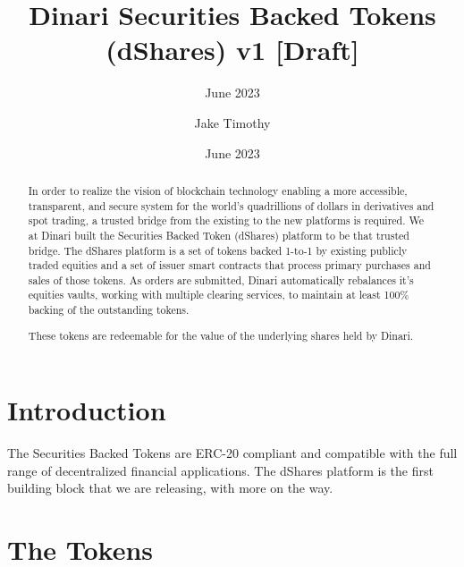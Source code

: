 \documentclass[sigconf,nonacm,prologue,table]{acmart}
\begin{document}
\title{Dinari Securities Backed Tokens (dShares) v1 [Draft]}
\subtitle{June 2023}
\date{June 2023}

\author{Jake Timothy}
\affiliation{}

\begin{teaserfigure}
\caption*{
    \hspace{\textwidth}
    }
\end{teaserfigure}

\renewcommand{\shortauthors}{Timothy}

\begin{abstract}

In order to realize the vision of blockchain technology enabling a more accessible, transparent, and secure system for the world’s quadrillions of dollars in derivatives and spot trading, a trusted bridge from the existing to the new platforms is required. We at Dinari built the Securities Backed Token (dShares) platform to be that trusted bridge. The dShares platform is a set of tokens backed 1-to-1 by existing publicly traded equities and a set of issuer smart contracts that process primary purchases and sales of those tokens. As orders are submitted, Dinari automatically rebalances it’s equities vaults, working with multiple clearing services, to maintain at least 100\% backing of the outstanding tokens.

These tokens are redeemable for the value of the underlying shares held by Dinari.

\end{abstract}

\maketitle

\section{Introduction} \label{sec:introduction}

The Securities Backed Tokens are ERC-20 compliant and compatible with the full range of decentralized financial applications. The dShares platform is the first building block that we are releasing, with more on the way.

\section{The Tokens} 
\label{sec:Tokens}
\end{document}
